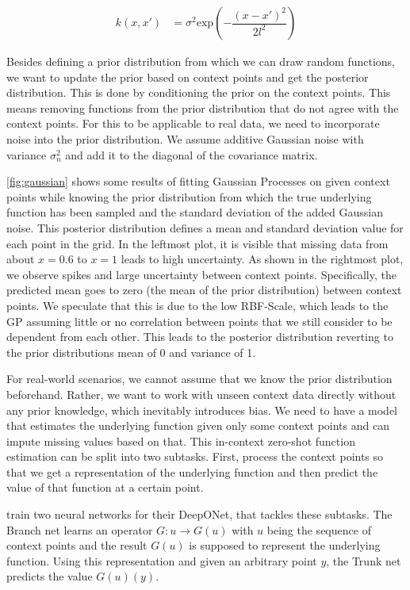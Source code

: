 \begin{align}
k(x,x') &= \sigma^2\text{exp}\left(-\dfrac{(x-x')^2}{2l^2}\right) \label{eq:rbf}
\end{align}

Besides defining a prior distribution from which we can draw random functions, we want to update the prior based on context points and get the posterior distribution. This is done by conditioning the prior on the context points. This means removing functions from the prior distribution that do not agree with the context points. For this to be applicable to real data, we need to incorporate noise into the prior distribution. We assume additive Gaussian noise with variance $\sigma_n^2$ and add it to the diagonal of the covariance matrix. \cite{williams2006gaussian}

\autoref{fig:gaussian} shows some results of fitting Gaussian Processes on given context points while knowing the prior distribution from which the true underlying function has been sampled and the standard deviation of the added Gaussian noise. This posterior distribution defines a mean and standard deviation value for each point in the grid. In the leftmost plot, it is visible that missing data from about $x=0.6$ to $x=1$ leads to high uncertainty. As shown in the rightmost plot, we observe spikes and large uncertainty between context points. Specifically, the predicted mean goes to zero (the mean of the prior distribution) between context points. We speculate that this is due to the low RBF-Scale, which leads to the GP assuming little or no correlation between points that we still consider to be dependent from each other. This leads to the posterior distribution reverting to the prior distributions mean of 0 and variance of 1.

For real-world scenarios, we cannot assume that we know the prior distribution beforehand. Rather, we want to work with unseen context data directly without any prior knowledge, which inevitably introduces bias. We need to have a model that estimates the underlying function given only some context points and can impute missing values based on that. This in-context zero-shot function estimation can be split into two subtasks. First, process the context points so that we get a representation of the underlying function and then predict the value of that function at a certain point.

\citet{Lu_2021} train two neural networks for their DeepONet, that tackles these subtasks. The Branch net learns an operator $G: u\rightarrow G(u)$ with $u$ being the sequence of context points and the result $G(u)$ is supposed to represent the underlying function. Using this representation and given an arbitrary point $y$, the Trunk net predicts the value $G(u)(y)$. \cite{Lu_2021}

